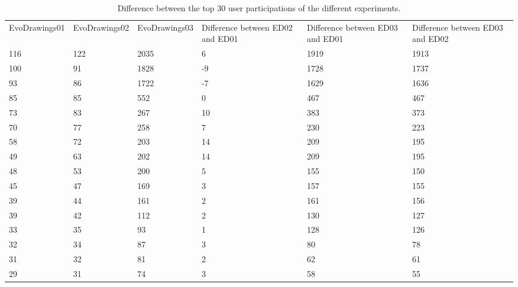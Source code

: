 \begin{table}
\small
\caption{Difference between the top 30 user participations  of the different experiments.}
\label{tab:totalIndividuals_3} 
\centering
\small
\begin{tabular}{p{2.5cm} p{2.5cm} p{2.5cm} p{2.5cm} p{2.5cm} p{2.5cm}}
\hline\noalign{\smallskip}
 EvoDrawings01 & EvoDrawings02 & EvoDrawings03 & Difference between ED02 and ED01  & Difference between ED03 and ED01 
 & Difference between ED03 and ED02 \\
\noalign{\smallskip}\hline\noalign{\smallskip}
\small{116} & \small{122}  & \small{2035} & \small{6} & \small{1919} & \small{1913}\\ \hline 
\small{100} & \small{91}  & \small{1828} & \small{-9} & \small{1728} & \small{1737}\\ \hline 
\small{93} & \small{86}  & \small{1722} & \small{-7} & \small{1629} & \small{1636}\\ \hline 
\small{85} & \small{85}  & \small{552} & \small{0} & \small{467} & \small{467}\\ \hline 
\small{73} & \small{83}  & \small{267} & \small{10} & \small{383} & \small{373}\\ \hline 
\small{70} & \small{77}  & \small{258} & \small{7} & \small{230} & \small{223}\\ \hline 
\small{58} & \small{72}  & \small{203} & \small{14} & \small{209} & \small{195}\\ \hline 
\small{49} & \small{63}  & \small{202} & \small{14} & \small{209} & \small{195}\\ \hline 
\small{48} & \small{53}  & \small{200} & \small{5} & \small{155} & \small{150}\\ \hline 
\small{45} & \small{47}  & \small{169} & \small{3} & \small{157} & \small{155}\\ \hline
\small{39} & \small{44}  & \small{161} & \small{2} & \small{161} & \small{156}\\ \hline 
\small{39} & \small{42}  & \small{112} & \small{2} & \small{130} & \small{127}\\ \hline 
\small{33} & \small{35}  & \small{93} & \small{1} & \small{128} & \small{126}\\ \hline 
\small{32} & \small{34}  & \small{87} & \small{3} & \small{80} & \small{78}\\ \hline 
\small{31} & \small{32}  & \small{81} & \small{2} & \small{62} & \small{61}\\ \hline 
\small{29} & \small{31}  & \small{74} & \small{3} & \small{58} & \small{55}\\ \hline 

\end{tabular}
\end{table}
